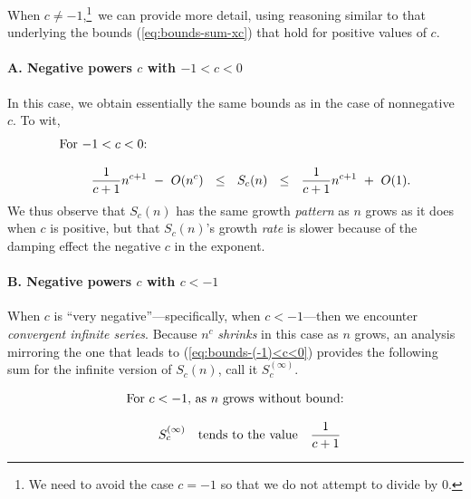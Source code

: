 When $c \neq -1$,\footnote{We need to avoid the case $c = -1$ so that
  we do not attempt to divide by $0$.}~we can provide more detail,
using reasoning similar to that underlying the bounds
(\ref{eq:bounds-sum-xc}) that hold for positive values of $c$.

\paragraph{\small\sf A. Negative powers $c$ with $-1 < c < 0$}

In this case, we obtain essentially the same bounds as in the case of
nonnegative $c$.  To wit,
\begin{equation}
\label{eq:bounds-(-1)<c<0}
\begin{array}{l}
\mbox{For $-1 < c< 0$:} \\
 \\
\hspace*{.35in}
{\displaystyle \frac{1}{c+1} n^{c+1} \ - \ O(n^c)}
  \ \ \leq \ \ S_c(n)
  \ \ \leq \ \
{\displaystyle \frac{1}{c+1} n^{c+1} \ + \ O(1)}.
\end{array}
\end{equation}
We thus observe that $S_c(n)$ has the same growth {\em pattern} as $n$
grows as it does when $c$ is positive, but that $S_c(n)$'s growth {\em
  rate} is slower because of the damping effect the negative $c$ in
the exponent.

\paragraph{\small\sf B. Negative powers $c$ with $c < -1$}

When $c$ is ``very negative''---specifically, when $c < -1$---then we
encounter {\em convergent infinite series}.  Because $n^c$ {\em
  shrinks} in this case as $n$ grows, an analysis mirroring the one
that leads to (\ref{eq:bounds-(-1)<c<0}) provides the following sum
for the infinite version of $S_c(n)$, call it $S_c^{(\infty)}$.

\begin{equation}
\label{eq:bounds-negative-(not-1)-sum-xc}
\begin{array}{l}
\mbox{For $c<-1$, as $n$ grows without bound:} \\
 \\
\hspace*{.35in}
S_c^{(\infty)} \ \ \mbox{ tends to the value } \ \
{\displaystyle \frac{1}{c+1}}
\end{array}
\end{equation}

